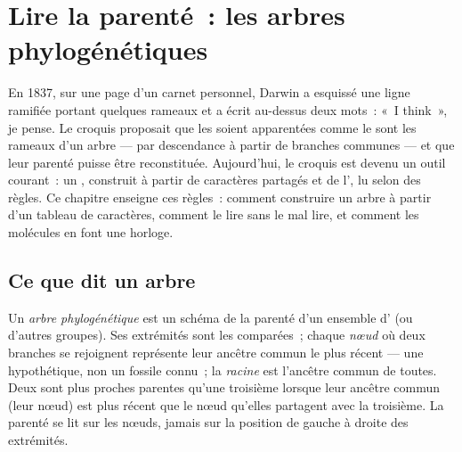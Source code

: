 \chapter{Lire la parenté~: les arbres phylogénétiques}\label{ch:g12:phylogenetic-trees}

En 1837, sur une page d'un carnet personnel, Darwin a esquissé une
ligne ramifiée portant quelques rameaux et a écrit au-dessus deux
mots~: «~I think~», je pense. Le croquis proposait que les 
soient apparentées comme le sont les rameaux d'un arbre --- par
descendance à partir de branches communes --- et que leur parenté
puisse être reconstituée. Aujourd'hui, le croquis est devenu un outil
courant~: un , construit à partir de caractères
partagés et de l', lu selon des règles. Ce chapitre enseigne ces
règles~: comment construire un arbre à partir d'un tableau de
caractères, comment le lire sans le mal lire, et comment les molécules
en font une horloge.

\section{Ce que dit un arbre}

\begin{definition}\label{def:g12:phylogenetic-trees:tree}
Un \emph{arbre phylogénétique} est un
schéma de la parenté d'un ensemble d' (ou d'autres groupes).
Ses extrémités sont les  comparées~; chaque \emph{nœud} où deux
branches se rejoignent représente leur ancêtre commun le plus
récent --- une  hypothétique, non un fossile connu~; la
\emph{racine} est l'ancêtre commun de toutes. Deux  sont plus
proches parentes qu'une troisième lorsque leur ancêtre commun (leur
nœud) est plus récent que le nœud qu'elles partagent avec la
troisième. La parenté se lit sur les nœuds, jamais sur la position de
gauche à droite des extrémités.
\end{definition}

